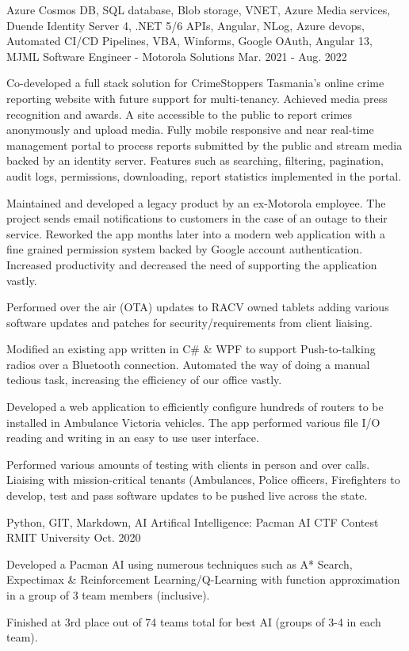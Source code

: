 \begin{cventries}
{    }
  \cventry
    {Azure Cosmos DB, SQL database, Blob storage, VNET, Azure Media services, Duende Identity Server 4, .NET 5/6 APIs, Angular, NLog, Azure devops, Automated CI/CD Pipelines, VBA, Winforms, Google OAuth, Angular 13, MJML}
    {Software Engineer - Motorola Solutions}
    {Mar. 2021 - Aug. 2022}
    {
      \begin{cvitems}
        \item {Co-developed a full stack solution for CrimeStoppers Tasmania's online crime reporting website with future support for multi-tenancy. Achieved media press recognition and awards. A site accessible to the public to report crimes anonymously and upload media. Fully mobile responsive and near real-time management portal to process reports submitted by the public and stream media backed by an identity server. Features such as searching, filtering, pagination, audit logs, permissions, downloading, report statistics implemented in the portal.}
		\item {Maintained and developed a legacy product by an ex-Motorola employee. The project sends email notifications to customers in the case of an outage to their service. Reworked the app months later into a modern web application with a fine grained permission system backed by Google account authentication. Increased productivity and decreased the need of supporting the application vastly.}
        \item {Performed over the air (OTA) updates to RACV owned tablets adding various software updates and patches for security/requirements from client liaising.}
		\item {Modified an existing app written in C\# \& WPF to support Push-to-talking radios over a Bluetooth connection. Automated the way of doing a manual tedious task, increasing the efficiency of our office vastly.}
        \item {Developed a web application to efficiently configure hundreds of routers to be installed in Ambulance Victoria vehicles. The app performed various file I/O reading and writing in an easy to use user interface.}
        \item {Performed various amounts of testing with clients in person and over calls. Liaising with mission-critical tenants (Ambulances, Police officers, Firefighters} to develop, test and pass software updates to be pushed live across the state.
      \end{cvitems}
    }
  \cventry
    {Python, GIT, Markdown, AI}
    {Artifical Intelligence: Pacman AI CTF Contest}
    {RMIT University}
    {Oct. 2020}
    {
      \begin{cvitems}
        \item {Developed a Pacman AI using numerous techniques such as A* Search, Expectimax \& Reinforcement Learning/Q-Learning with function approximation in a group of 3 team members (inclusive).}
        \item {Finished at 3rd place out of 74 teams total for best AI (groups of 3-4 in each team).}
      \end{cvitems}
    }
\end{cventries}
